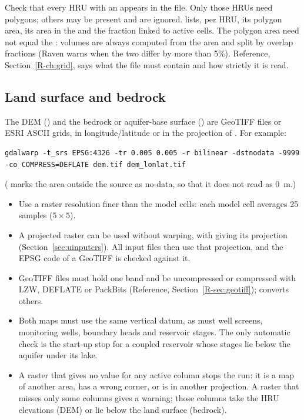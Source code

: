Check that every HRU with an  appears in the file. Only those HRUs need polygons; others may be
present and are ignored.  lists, per HRU, its polygon area, its area in the  and the
fraction linked to active cells. The polygon area need not equal the  : volumes are always computed
from the  area and split by overlap fractions (Raven warns when the two differ by more than 5\%). Reference,
Section~\ref{R-ch:grid}, says what the file must contain and how strictly it is read.

\subsection{Land surface and bedrock}\label{sec:urasters}
The DEM () and the bedrock or aquifer-base surface () are GeoTIFF files or ESRI
ASCII grids, in longitude/latitude or in the projection of . For example:
\par\noindent\begin{minipage}{\linewidth}
\begin{lstlisting}
gdalwarp -t_srs EPSG:4326 -tr 0.005 0.005 -r bilinear -dstnodata -9999 -co COMPRESS=DEFLATE dem.tif dem_lonlat.tif
\end{lstlisting}
\end{minipage}\par\smallskip
( marks the area outside the source as no-data, so that it does not read as 0~m.)
\begin{itemize}
\item Use a raster resolution finer than the model cells: each model cell averages 25 samples ($5\times5$).
\item A projected raster can be used without warping, with  giving its projection
(Section~\ref{sec:uinputcrs}). All input files then use that projection, and the EPSG code of a GeoTIFF is checked
against it.
\item GeoTIFF files must hold one band and be uncompressed or compressed with LZW, DEFLATE or PackBits (Reference,
Section~\ref{R-sec:geotiff});  converts others.
\item Both maps must use the same vertical datum, as must well screens, monitoring wells, boundary heads and reservoir
stages. The only automatic check is the start-up stop for a coupled reservoir whose stages lie below the aquifer under
its lake.
\item A raster that gives no value for any active column stops the run: it is a map of another area, has a wrong corner,
or is in another projection. A raster that misses only some columns gives a warning; those columns take the HRU
elevations (DEM) or lie  below the land surface (bedrock).
\end{itemize}


